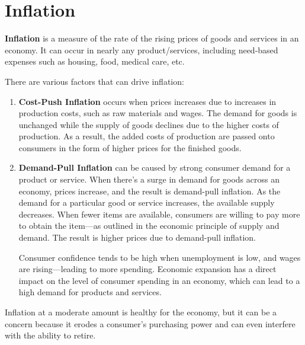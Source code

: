 \documentclass{article}
\begin{document}
\section{Inflation}

  \begin{definition}[Inflation]
    \textbf{Inflation} is a measure of the rate of the rising prices of goods and services in an economy. It can occur in nearly any product/services, including need-based expenses such as housing, food, medical care, etc. 

    There are various factors that can drive inflation: 
    \begin{enumerate}
      \item \textbf{Cost-Push Inflation} occurs when prices increases due to increases in production costs, such as raw materials and wages. The demand for goods is unchanged while the supply of goods declines due to the higher costs of production. As a result, the added costs of production are passed onto consumers in the form of higher prices for the finished goods. 
      \item \textbf{Demand-Pull Inflation} can be caused by strong consumer demand for a product or service. When there's a surge in demand for goods across an economy, prices increase, and the result is demand-pull inflation. As the demand for a particular good or service increases, the available supply decreases. When fewer items are available, consumers are willing to pay more to obtain the item—as outlined in the economic principle of supply and demand. The result is higher prices due to demand-pull inflation.
      
      Consumer confidence tends to be high when unemployment is low, and wages are rising—leading to more spending. Economic expansion has a direct impact on the level of consumer spending in an economy, which can lead to a high demand for products and services.
    \end{enumerate}

    Inflation at a moderate amount is healthy for the economy, but it can be a concern because it erodes a consumer's purchasing power and can even interfere with the ability to retire. 
  \end{definition}
\end{document}
